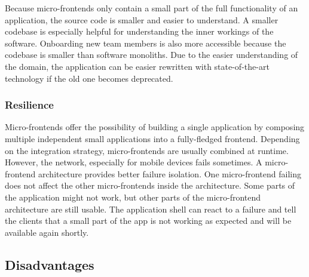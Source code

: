 Because micro-frontends only contain a small part of the full functionality of an application, the source code is smaller and easier to understand. A smaller codebase is especially helpful for understanding the inner workings of the software. Onboarding new team members is also more accessible because the codebase is smaller than software monoliths. Due to the easier understanding of the domain, the application can be easier rewritten with state-of-the-art technology if the old one becomes deprecated. \cite{book:2020:geers:background:micro-frontends:micro-frontends-in-action}

\subsubsection{Resilience}\label{subsubsection:background:micro-frontend-resilience}

Micro-frontends offer the possibility of building a single application by composing multiple independent small applications into a fully-fledged frontend. Depending on the integration strategy, micro-frontends are usually combined at runtime. However, the network, especially for mobile devices fails sometimes. A micro-frontend architecture provides better failure isolation. One micro-frontend failing does not affect the other micro-frontends inside the architecture. Some parts of the application might not work, but other parts of the micro-frontend architecture are still usable. The application shell can react to a failure and tell the clients that a small part of the app is not working as expected and will be available again shortly. \cite[10-11]{article:2021:perltonen:background:micro-frontends:motivations-benefits-and-issues}

\subsection{Disadvantages}\label{subsection:background:micro-frontend-downsides}

